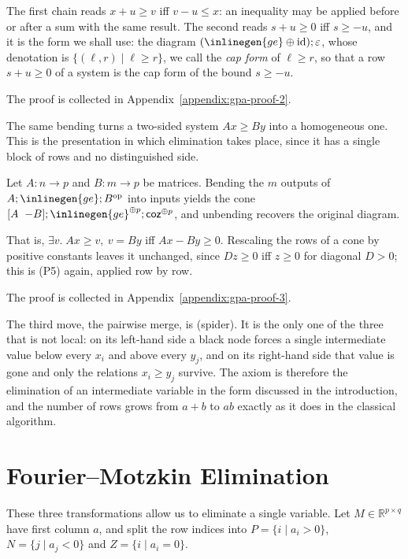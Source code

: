 The first chain reads $x+u\ge v$ iff $v-u\le x$: an inequality may be applied
before or after a sum with the same result. The second reads $s+u\ge0$ iff
$s\ge-u$, and it is the form we shall use: the diagram
$(\inlinegen{ge}\oplus\mathrm{id});\varepsilon$, whose denotation is
$\{(\ell,r)\mid \ell\ge r\}$, we call the \emph{cap form} of $\ell\ge r$, so
that a row $s+u\ge0$ of a system is the cap form of the bound $s\ge-u$.

\noindent The proof is collected in Appendix~\ref{appendix:gpa-proof-2}.

The same bending turns a two-sided system $Ax\ge By$ into a homogeneous one.
This is the presentation in which elimination takes place, since it has a
single block of rows and no distinguished side.

\begin{lemma}\label{lem:coneform}
    Let $A:n\to p$ and $B:m\to p$ be matrices. Bending the $m$ outputs of
    $A;\inlinegen{ge};B^{\mathrm{op}}$ into inputs yields the cone
    $[A\;\;{-B}];\inlinegen{ge}^{\oplus p};\mathsf{coz}^{\oplus p}$, and
    unbending recovers the original diagram.
    
\end{lemma}

That is, $\exists v.\;Ax\ge v,\ v=By$ iff $Ax-By\ge0$. Rescaling the rows of a
cone by positive constants leaves it unchanged, since $Dz\ge0$ iff $z\ge0$ for
diagonal $D>0$; this is (P5) again, applied row by row.

\noindent The proof is collected in Appendix~\ref{appendix:gpa-proof-3}.

The third move, the pairwise merge, is (spider). It is the only one of the
three that is not local: on its left-hand side a black node forces a single
intermediate value below every $x_i$ and above every $y_j$, and on its
right-hand side that value is gone and only the relations $x_i\ge y_j$ survive.
The axiom is therefore the elimination of an intermediate variable in the form
discussed in the introduction, and the number of rows grows from $a+b$ to
$ab$ exactly as it does in the classical algorithm.

\section{Fourier--Motzkin Elimination}\label{sec:gpa-fme}

These three transformations allow us to eliminate a single variable. Let
$M\in\mathbb{R}^{p\times q}$ have first column $a$, and split the row indices
into $P=\{i\mid a_i>0\}$, $N=\{j\mid a_j<0\}$ and $Z=\{i\mid a_i=0\}$.

